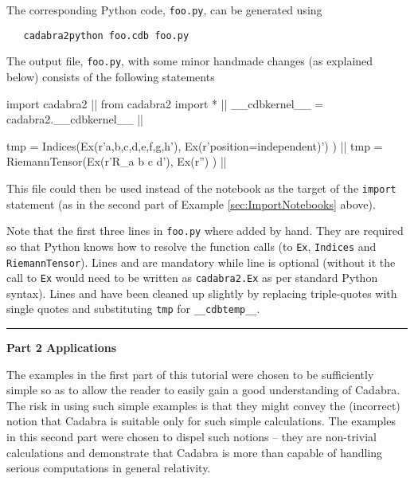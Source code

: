 \documentclass[a4paper,12pt]{article}
\numberwithin{equation}{section}%
\begin{document}
The corresponding Python code, \verb|foo.py|, can be generated using
\bgroup
\lstset{numbers=none}
\begin{lstlisting}
   cadabra2python foo.cdb foo.py
\end{lstlisting}
\egroup
The output file, \verb|foo.py|, with some minor handmade changes (as explained below)
consists of the following statements
\begin{cadabra}
   import cadabra2                                  ||
   from cadabra2 import *                           ||
   __cdbkernel__ = cadabra2.__cdbkernel__           ||

   tmp = Indices(Ex(r'{a,b,c,d,e,f,g,h}'), Ex(r'position=independent)') ) ||
   tmp = RiemannTensor(Ex(r'R_{a b c d}'), Ex(r'') )                      ||
\end{cadabra}
This file could then be used instead of the notebook as the target of the \verb|import|
statement (as in the second part of Example \ref{sec:ImportNotebooks} above).

Note that the first three lines in \verb|foo.py| where added by hand. They are required so
that Python knows how to resolve the function calls (to \verb|Ex|, \verb|Indices| and
\verb|RiemannTensor|). Lines  and  are mandatory while line
 is optional (without it the call to \verb|Ex| would need to be written as
\verb|cadabra2.Ex| as per standard Python syntax). Lines  and
 have been cleaned up slightly by replacing triple-quotes with single quotes
and substituting \verb|tmp| for \verb|__cdbtemp__|.

\clearpage

\hrule height 0pt
\vskip 4cm
{\Huge\bf Part 2 Applications}
\vskip 2cm

The examples in the first part of this tutorial were chosen to be sufficiently simple so as
to allow the reader to easily gain a good understanding of Cadabra. The risk in using such
simple examples is that they might convey the (incorrect) notion that Cadabra is suitable
only for such simple calculations. The examples in this second part were chosen to dispel
such notions -- they are non-trivial calculations and demonstrate that Cadabra is more than
capable of handling serious computations in general relativity.
\end{document}
